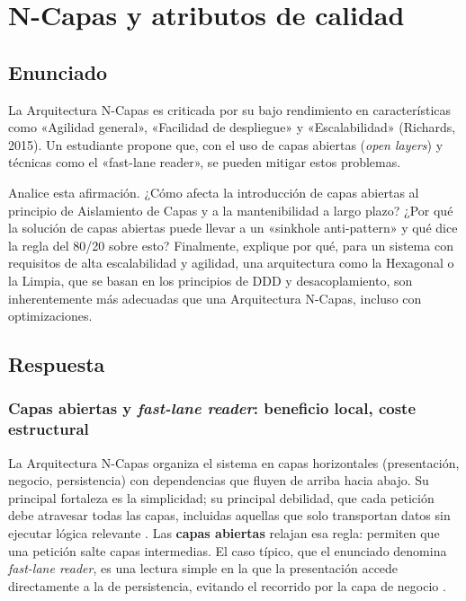 \section{N-Capas y atributos de calidad}

\subsection{Enunciado}
La Arquitectura N-Capas es criticada por su bajo rendimiento en características como «Agilidad
general», «Facilidad de despliegue» y «Escalabilidad» (Richards, 2015). Un estudiante propone
que, con el uso de capas abiertas (\emph{open layers}) y técnicas como el «fast-lane reader», se
pueden mitigar estos problemas.

Analice esta afirmación. ¿Cómo afecta la introducción de capas abiertas al principio de
Aislamiento de Capas y a la mantenibilidad a largo plazo? ¿Por qué la solución de capas abiertas
puede llevar a un «sinkhole anti-pattern» y qué dice la regla del 80/20 sobre esto? Finalmente,
explique por qué, para un sistema con requisitos de alta escalabilidad y agilidad, una
arquitectura como la Hexagonal o la Limpia, que se basan en los principios de DDD y
desacoplamiento, son inherentemente más adecuadas que una Arquitectura N-Capas, incluso con
optimizaciones.

\subsection{Respuesta}

\subsubsection{Capas abiertas y \emph{fast-lane reader}: beneficio local, coste estructural}
La Arquitectura N-Capas organiza el sistema en capas horizontales (presentación, negocio, persistencia) con dependencias que fluyen de arriba hacia abajo. Su principal fortaleza es la simplicidad; su principal debilidad, que cada petición debe atravesar todas las capas, incluidas aquellas que solo transportan datos sin ejecutar lógica relevante \parencite{richards2015patterns}. Las \textbf{capas abiertas} relajan esa regla: permiten que una petición salte capas intermedias. El caso típico, que el enunciado denomina \emph{fast-lane reader}, es una lectura simple en la que la presentación accede directamente a la de persistencia, evitando el recorrido por la capa de negocio \parencite{richards2020fundamentals}.

